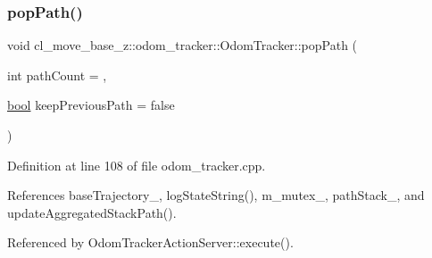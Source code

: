\subsubsection{\texorpdfstring{pop\+Path()}{popPath()}}
{\footnotesize\ttfamily void cl\+\_\+move\+\_\+base\+\_\+z\+::odom\+\_\+tracker\+::\+Odom\+Tracker\+::pop\+Path (\begin{DoxyParamCaption}\item[{int}]{path\+Count = {},  }\item[{\hyperlink{classbool}{bool}}]{keep\+Previous\+Path = {\ttfamily false} }\end{DoxyParamCaption})}



Definition at line 108 of file odom\+\_\+tracker.\+cpp.



References base\+Trajectory\+\_\+, log\+State\+String(), m\+\_\+mutex\+\_\+, path\+Stack\+\_\+, and update\+Aggregated\+Stack\+Path().



Referenced by Odom\+Tracker\+Action\+Server\+::execute().


